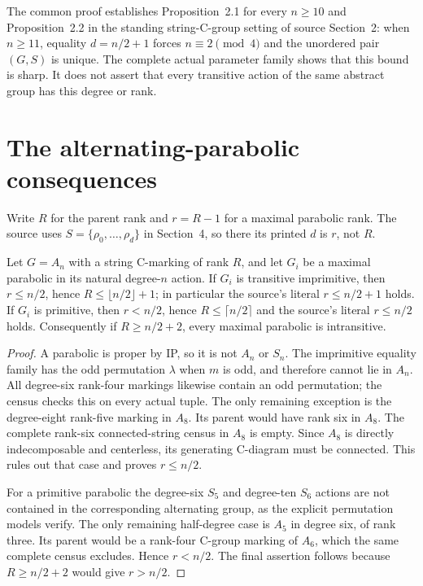 \documentclass[11pt]{article}
\begin{document}
The common proof establishes Proposition~2.1 for every $n\geq10$ and
Proposition~2.2 in the standing string-C-group setting of source Section~2:
when $n\geq11$, equality $d=n/2+1$ forces $n\equiv2\pmod4$ and the
unordered pair $(G,S)$ is unique. The complete actual parameter family
shows that this bound is sharp. It does not assert that every transitive
action of the same abstract group has this degree or rank.

\section{The alternating-parabolic consequences}
Write $R$ for the parent rank and $r=R-1$ for a maximal parabolic rank.
The source uses $S=\{\rho_0,\ldots,\rho_d\}$ in Section~4, so there
its printed $d$ is $r$, not $R$.

\begin{corollary}
Let $G=A_n$ with a string C-marking of rank $R$, and let $G_i$ be a
maximal parabolic in its natural degree-$n$ action.
If $G_i$ is transitive imprimitive, then $r\leq n/2$, hence
$R\leq\lfloor n/2\rfloor+1$; in particular the source's literal
$r\leq n/2+1$ holds. If $G_i$ is primitive, then $r<n/2$, hence
$R\leq\lceil n/2\rceil$ and the source's literal $r\leq n/2$ holds.
Consequently if $R\geq n/2+2$, every maximal parabolic is intransitive.
\end{corollary}
\begin{proof}
A parabolic is proper by IP, so it is not $A_n$ or $S_n$.
The imprimitive equality family has the odd permutation $\lambda$
when $m$ is odd, and therefore cannot lie in $A_n$. All degree-six
rank-four markings likewise contain an odd permutation; the census
checks this on every actual tuple. The only remaining exception is
the degree-eight rank-five marking in $A_8$. Its parent would have
rank six in $A_8$. The complete rank-six connected-string census in
$A_8$ is empty. Since $A_8$ is directly indecomposable and centerless,
its generating C-diagram must be connected. This rules out that case
and proves $r\leq n/2$.

For a primitive parabolic the degree-six $S_5$ and degree-ten $S_6$
actions are not contained in the corresponding alternating group,
as the explicit permutation models verify. The only remaining
half-degree case is $A_5$ in degree six, of rank three. Its parent
would be a rank-four C-group marking of $A_6$, which the same complete
census excludes. Hence $r<n/2$. The final assertion follows because
$R\geq n/2+2$ would give $r>n/2$.
\end{proof}
\end{document}
